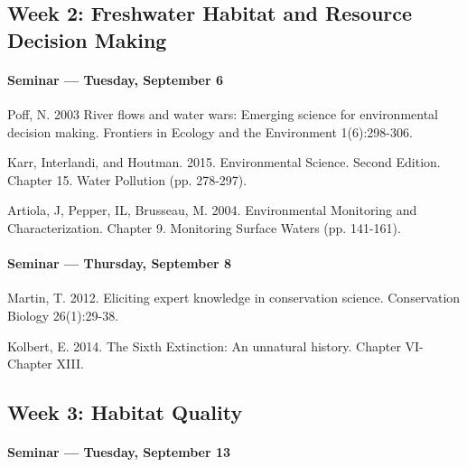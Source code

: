      \subsection{\textbf{Week 2}: Freshwater Habitat and Resource Decision Making}
      
      \paragraph{Seminar --- Tuesday, September 6}
      
      \begin{itemize*}
      \item Poff, N. 2003 River flows and water wars: Emerging science for environmental decision making. Frontiers in Ecology and the Environment 1(6):298-306.
      \item Karr, Interlandi, and Houtman. 2015. Environmental Science. Second Edition. Chapter 15. Water Pollution (pp. 278-297).
      \item Artiola, J, Pepper, IL, Brusseau, M. 2004. Environmental Monitoring and Characterization. Chapter 9. Monitoring Surface Waters (pp. 141-161).
      
      \end{itemize*}
    
      
      \paragraph{Seminar --- Thursday, September 8}
      
      \begin{itemize*}
      \item Martin, T. 2012. Eliciting expert knowledge in conservation science. Conservation Biology 26(1):29-38.
      \item Kolbert, E. 2014. The Sixth Extinction: An unnatural history. Chapter VI-Chapter XIII.
      \end{itemize*}
      

      
      \subsection{\textbf{Week 3}: Habitat Quality}
      
      \paragraph{Seminar --- Tuesday, September 13}
      
